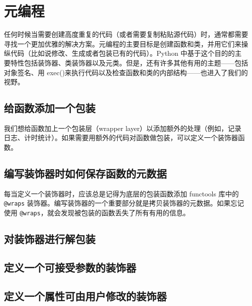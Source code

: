 \chapter{元编程\label{ch09}}
任何时候当需要创建高度重复的代码（或者需要复制粘贴源代码）时，通常都需要寻找一个更加优雅的解决方案。元编程的主要目标是创建函数和类，并用它们来操纵代码（比如说修改、生成或者包装已有的代码）。Python 中基于这个目的的主要特性包括装饰器、类装饰器以及元类。但是，还有许多其他有用的主题——包括对象签名、用 exec()来执行代码以及检查函数和类的内部结构——也进入了我们的视野。
\section{给函数添加一个包装}
我们想给函数加上一个包装层（wrapper layer）以添加额外的处理（例如，记录日志、计时统计）。如果需要用额外的代码对函数做包装，可以定义一个装饰器函数。
\section{编写装饰器时如何保存函数的元数据}
每当定义一个装饰器时，应该总是记得为底层的包装函数添加 functools 库中的 \verb|@wraps| 装饰器。编写装饰器的一个重要部分就是拷贝装饰器的元数据。如果忘记使用 \verb|@wraps|，就会发现被包装的函数丢失了所有有用的信息。
\section{对装饰器进行解包装}
\section{定义一个可接受参数的装饰器}
\section{定义一个属性可由用户修改的装饰器}
